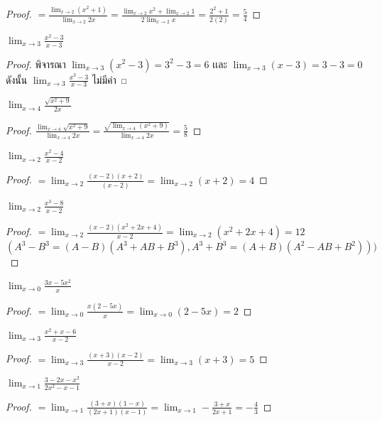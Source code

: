 \documentclass[a4paper,12pt]{scrartcl}
\begin{document}
\begin{proof}
	$= \frac{\lim_{x \to 2} (x^2+1)}{\lim_{x \to 2} 2x} =  \frac{\lim_{x \to 2} x^2+\lim_{x \to 2} 1}{2\lim_{x \to 2} x} =  \frac{2^2+1}{2(2)}=\frac{5}{4}$
\end{proof}
\begin{example}
	$\lim_{x \to 3} \frac{x^2-3}{x-3}$
\end{example}
\begin{proof}
	พิจารณา $\lim_{x \to 3} (x^2-3) = 3^2-3 =6$ เเละ $\lim_{x \to 3} (x-3) = 3-3 =0$ ดังนั้น $\lim_{x \to 3} \frac{x^3-3}{x-3} $ ไม่มีค่า
\end{proof}

\begin{example}
	$\lim_{x \to 4} \frac{\sqrt{x^2+9}}{2x}$
\end{example}
\begin{proof}
	$\frac{\lim_{x \to 4}\sqrt{x^2+9}}{\lim_{x \to 4}2x} = \frac{ \sqrt{\lim_{x \to 4}(x^2+9)}}{\lim_{x \to 4}2x} = \frac{5}{8}$
\end{proof}
\begin{example}
	$\lim_{x \to 2} \frac{x^2-4}{x-2}$
\end{example}
\begin{proof}
	$ =\lim_{x \to 2} \frac{(x-2)(x+2)}{(x-2)} = \lim_{x \to 2} (x+2) = 4$
\end{proof}
\begin{example}
	$\lim_{x \to 2} \frac{x^3-8}{x-2}$
\end{example}
\begin{proof}
	$ =  \lim_{x \to 2} \frac{(x-2)(x^2+2x+4)}{x-2} = \lim_{x \to 2}(x^2+2x+4) =12$  $(A^3-B^3=(A-B)(A^3+AB+B^3),A^3+B^3=(A+B)(A^2-AB+B^2)))$
\end{proof}
\begin{example}
	$\lim_{x \to 0} \frac{3x-5x^2}{x}$
\end{example}
\begin{proof}
	$= \lim_{x \to 0} \frac{x(2-5x)}{x}= \lim_{x \to 0} (2-5x) =2 $
\end{proof}
\begin{example}
	$\lim_{x\to 3} \frac{x^2+x-6}{x-2}$ 
\end{example}
\begin{proof}
	$= \lim_{x\to 3} \frac{(x+3)(x-2)}{x-2} = \lim_{x\to 3}(x+3) =5$
\end{proof}
\begin{example}
	$\lim_{x \to 1} \frac{3-2x-x^2}{2x^2-x-1}$
\end{example}
\begin{proof}
$ = \lim_{x\to 1} \frac{(3+x)(1-x)}{(2x+1)(x-1)}=\lim_{x \to 1} -\frac{3+x}{2x+1} = -\frac{4}{3}$
\end{proof}
\end{document}
